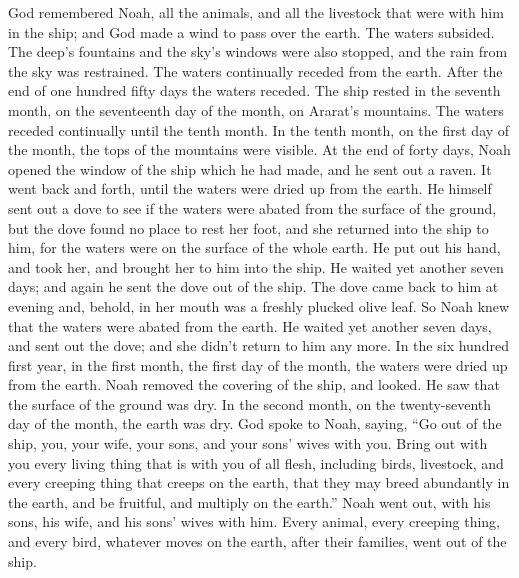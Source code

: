 \begin{paracol}{2}
\begin{otherlanguage}{english}
 God remembered Noah, all the animals, and all the
livestock that were with him in the ship; and God made a wind to pass
over the earth. The waters subsided.  The deep's fountains
and the sky's windows were also stopped, and the rain from the sky was
restrained.  The waters continually receded from the
earth. After the end of one hundred fifty days the waters receded.
 The ship rested in the seventh month, on the seventeenth
day of the month, on Ararat's mountains.  The waters
receded continually until the tenth month. In the tenth month, on the
first day of the month, the tops of the mountains were visible.
 At the end of forty days, Noah opened the window of the
ship which he had made,  and he sent out a raven. It went
back and forth, until the waters were dried up from the earth.
 He himself sent out a dove to see if the waters were
abated from the surface of the ground,  but the dove found
no place to rest her foot, and she returned into the ship to him, for
the waters were on the surface of the whole earth. He put out his hand,
and took her, and brought her to him into the ship.  He
waited yet another seven days; and again he sent the dove out of the
ship.  The dove came back to him at evening and, behold,
in her mouth was a freshly plucked olive leaf. So Noah knew that the
waters were abated from the earth.  He waited yet another
seven days, and sent out the dove; and she didn't return to him any
more.  In the six hundred first year, in the first month,
the first day of the month, the waters were dried up from the earth.
Noah removed the covering of the ship, and looked. He saw that the
surface of the ground was dry.  In the second month, on
the twenty-seventh day of the month, the earth was dry. 
God spoke to Noah, saying,  ``Go out of the ship, you,
your wife, your sons, and your sons' wives with you. 
Bring out with you every living thing that is with you of all flesh,
including birds, livestock, and every creeping thing that creeps on the
earth, that they may breed abundantly in the earth, and be fruitful, and
multiply on the earth.''  Noah went out, with his sons,
his wife, and his sons' wives with him.  Every animal,
every creeping thing, and every bird, whatever moves on the earth, after
their families, went out of the ship.

\hypertarget{noahs-holocaust-and-gods-promise}{%
}
\end{otherlanguage}
\end{paracol}
